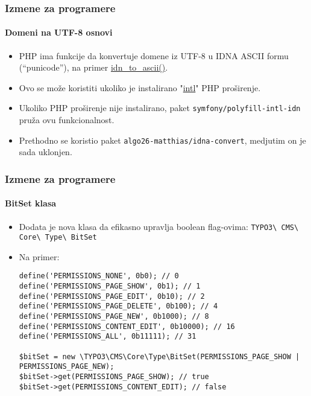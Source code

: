 \begin{frame}[fragile]
	\frametitle{Izmene za programere}
	\framesubtitle{Domeni na UTF-8 osnovi}

	\begin{itemize}
		\item PHP ima funkcije da konvertuje domene iz UTF-8 u IDNA ASCII formu (“punicode”),
			na primer \href{https://www.php.net/manual/en/function.idn-to-ascii.php}{idn\_to\_ascii()}.

		\item Ovo se može koristiti ukoliko je instalirano
			"\href{https://www.php.net/manual/en/book.intl.php}{intl}" PHP proširenje.

		\item Ukoliko PHP proširenje nije instalirano, paket \texttt{symfony/polyfill-intl-idn}
			pruža ovu funkcionalnost.

		\item Prethodno se koristio paket \texttt{algo26-matthias/idna-convert}, medjutim on je sada uklonjen.

	\end{itemize}

\end{frame}


\begin{frame}[fragile]
	\frametitle{Izmene za programere}
	\framesubtitle{BitSet klasa}

	\lstset{basicstyle=\tiny\ttfamily}

	\begin{itemize}
		\item Dodata je nova klasa da efikasno upravlja boolean flag-ovima:\newline
			\texttt{TYPO3\textbackslash
				CMS\textbackslash
				Core\textbackslash
				Type\textbackslash
				BitSet}

		\item Na primer:

\begin{lstlisting}
define('PERMISSIONS_NONE', 0b0); // 0
define('PERMISSIONS_PAGE_SHOW', 0b1); // 1
define('PERMISSIONS_PAGE_EDIT', 0b10); // 2
define('PERMISSIONS_PAGE_DELETE', 0b100); // 4
define('PERMISSIONS_PAGE_NEW', 0b1000); // 8
define('PERMISSIONS_CONTENT_EDIT', 0b10000); // 16
define('PERMISSIONS_ALL', 0b11111); // 31

$bitSet = new \TYPO3\CMS\Core\Type\BitSet(PERMISSIONS_PAGE_SHOW | PERMISSIONS_PAGE_NEW);
$bitSet->get(PERMISSIONS_PAGE_SHOW); // true
$bitSet->get(PERMISSIONS_CONTENT_EDIT); // false
\end{lstlisting}

	\end{itemize}

\end{frame}


